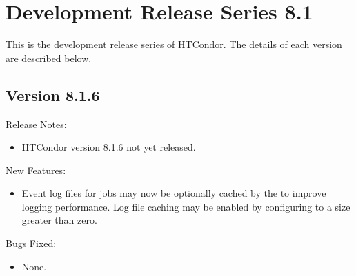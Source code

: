 
\section{\label{sec:History-8-1}Development Release Series 8.1}

This is the development release series of HTCondor.
The details of each version are described below.


\subsection*{\label{sec:New-8-1-6}Version 8.1.6}

\noindent Release Notes:

\begin{itemize}

\item HTCondor version 8.1.6 not yet released.

\end{itemize}


\noindent New Features:

\begin{itemize}

\item Event log files for jobs may now be optionally cached by the  
to improve logging performance.  Log file caching may be enabled by configuring
 to a size greater than zero.

\end{itemize}

\noindent Bugs Fixed:

\begin{itemize}

\item None.

\end{itemize}

